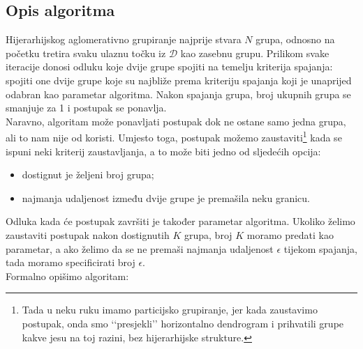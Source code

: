 \documentclass[times, utf8, zavrsni]{fer}
\begin{document}
\subsection{Opis algoritma}
Hijerarhijskog aglomerativno grupiranje najprije stvara $N$ grupa, odnosno na početku tretira svaku ulaznu točku iz $\mathcal{D}$ kao zasebnu grupu. Prilikom svake iteracije donosi odluku koje dvije grupe spojiti na temelju kriterija spajanja: spojiti one dvije grupe koje su najbliže prema kriteriju spajanja koji je unaprijed odabran kao parametar algoritma. Nakon spajanja grupa, broj ukupnih grupa se smanjuje za 1 i postupak se ponavlja.\\
Naravno, algoritam može ponavljati postupak dok ne ostane samo jedna grupa, ali to nam nije od koristi. Umjesto toga, postupak možemo zaustaviti\footnote{Tada u neku ruku imamo particijsko grupiranje, jer kada zaustavimo postupak, onda smo ‘‘presjekli’’ horizontalno dendrogram i prihvatili grupe kakve jesu na toj razini, bez hijerarhijske strukture.} kada se ispuni neki kriterij zaustavljanja, a to može biti jedno od sljedećih opcija:
\begin{itemize}
    \item dostignut je željeni broj grupa;
    \item najmanja udaljenost između dvije grupe je premašila neku granicu.
\end{itemize}
Odluka kada će postupak završiti je također parametar algoritma. Ukoliko želimo zaustaviti postupak nakon dostignutih $K$ grupa, broj $K$ moramo predati kao parametar, a ako želimo da se ne premaši najmanja udaljenost $\epsilon$ tijekom spajanja, tada moramo specificirati broj $\epsilon$.\\
Formalno opišimo algoritam:
\end{document}
